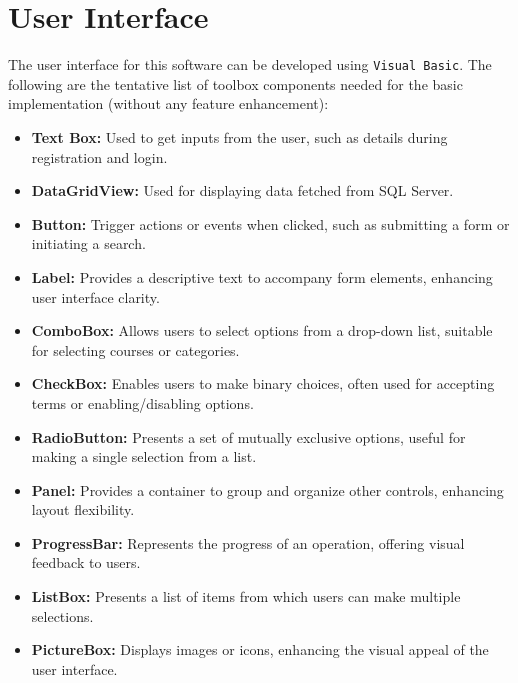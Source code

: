 \documentclass[12pt,a4paper]{article}
\begin{document}
\section{User Interface}
	The user interface for this software can be developed using \texttt{Visual Basic}. The following are the tentative list of toolbox components needed for the basic implementation (without any feature enhancement):
    \begin{itemize}
\item \textbf{Text Box:} Used to get inputs from the user, such as details during registration and login.

    \item \textbf{DataGridView:} Used for displaying data fetched from SQL Server.

    \item \textbf{Button:} Trigger actions or events when clicked, such as submitting a form or initiating a search.

    \item \textbf{Label:} Provides a descriptive text to accompany form elements, enhancing user interface clarity.

    \item \textbf{ComboBox:} Allows users to select options from a drop-down list, suitable for selecting courses or categories.

    \item \textbf{CheckBox:} Enables users to make binary choices, often used for accepting terms or enabling/disabling options.

    \item \textbf{RadioButton:} Presents a set of mutually exclusive options, useful for making a single selection from a list.

    \item \textbf{Panel:} Provides a container to group and organize other controls, enhancing layout flexibility.

    \item \textbf{ProgressBar:} Represents the progress of an operation, offering visual feedback to users.

    \item \textbf{ListBox:} Presents a list of items from which users can make multiple selections.

    \item \textbf{PictureBox:} Displays images or icons, enhancing the visual appeal of the user interface.



\end{itemize}
\end{document}
